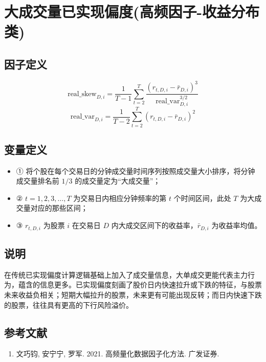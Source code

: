 \documentclass{article}
\begin{document}
\section{大成交量已实现偏度(高频因子-收益分布类)}

\subsection{因子定义}
\begin{equation}
    \mathrm{real\_skew}_{D,i} = \frac{1}{T-1}\sum_{t=2}^{T}\frac{  \left( r_{t,D,i} - \bar{r}_{D,i} \right)^3}{\mathrm{real\_var}_{D,i}^{3/2}}
\end{equation}
\begin{equation}
    \mathrm{real\_var}_{D,i} = \frac{1}{T-2} \sum_{t=2}^{T} \left( r_{t,D,i} - \bar{r}_{D,i} \right)^2
\end{equation}

\subsection{变量定义}
\begin{itemize}
    \item ① 将个股在每个交易日的分钟成交量时间序列按照成交量大小排序，将分钟成交量排名前 \(1/3\) 的成交量定为“大成交量”；
    \item ② \(t=1,2,3,\ldots,T\) 为交易日内相应分钟频率的第 \(t\) 个时间区间，此处 \(T\) 为大成交量对应的那些区间；
    \item ③ \( r_{t,D,i} \) 为股票 \(i\) 在交易日 \(D\) 内大成交区间下的收益率，\(\bar{r}_{D,i}\) 为收益率均值。
\end{itemize}

\subsection{说明}
在传统已实现偏度计算逻辑基础上加入了成交量信息，大单成交更能代表主力行为，蕴含的信息更多。已实现偏度刻画了股价日内快速拉升或下跌的特征，与股票未来收益负相关；短期大幅拉升的股票，未来更有可能出现反转；而日内快速下跌的股票，往往具有更高的下行风险溢价。

\subsection{参考文献}
\begin{enumerate}
    \item 文巧钧, 安宁宁, 罗军. 2021. 高频量化数据因子化方法. 广发证券.
\end{enumerate}
\end{document}
